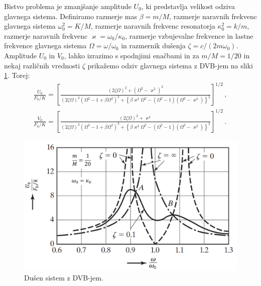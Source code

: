         Bistvo problema je zmanjšanje amplitude $U_0$, ki predstavlja velikost odziva glavnega sistema. Definiramo razmerje mas $\beta=m/M$, razmerje naravnih frekvenc glavnega sistema $\omega_0^2=K/M$, razmerje naravnih frekvenc resonatorja $\kappa_0^2=k/m$, razmerje naravnih frekvenc $\varkappa=\omega_0 / \kappa_0$, razmerje vzbujevalne frekvence in lastne frekvence glavnega sistema $\Omega=\omega/\omega_0$ in razmernik dušenja $\zeta=c/(2m\omega_0)$. Amplitude $U_0$ in $V_0$, lahko izrazimo s spodnjimi enačbami in za $m/M=1/20$ in nekaj različnih vrednosti $\zeta$ prikažemo odziv glavnega sistema z DVB-jem na sliki \ref{fig:sistem_2ps_2}. Torej:
        \begin{align}
            \frac{U_0}{F_0/K}=\left[\frac{(2 \zeta \Omega)^2+\left(\Omega^2-\varkappa^2\right)^2}{(2 \zeta \Omega)^2\left(\Omega^2-1+\beta \Omega^2\right)^2+\left\{\beta \varkappa^2 \Omega^2-\left(\Omega^2-1\right)\left(\Omega^2-\varkappa^2\right)\right\}^2}\right]^{1 / 2}\,,\\
            \frac{V_0}{F_0/K}=\left[\frac{(2 \zeta \Omega)^2+\varkappa^4}{(2 \zeta \Omega)^2\left(\Omega^2-1+\beta \Omega^2\right)^2+\left\{\beta \varkappa^2 \Omega^2-\left(\Omega^2-1\right)\left(\Omega^2-\varkappa^2\right)\right\}^2}\right]^{1 / 2}\,.
        \end{align}
        \begin{figure}[!hb]
            \centering
            \includegraphics[scale=0.34]{slike/teorija/ozadje_problema.png}
            \caption{Dušen sistem z DVB-jem.}\label{fig:sistem_2ps_2}
        \end{figure}

